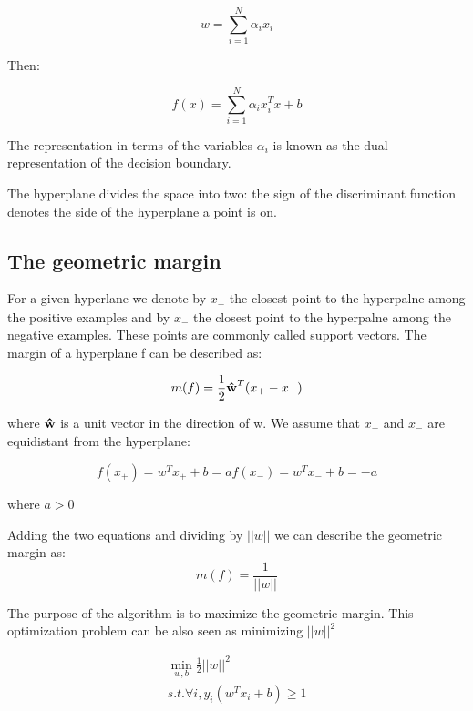 \begin{equation}
w = \sum_{i=1}^{N} \alpha_{i}x_{i}
\end{equation}

Then:

\begin{equation}
f(x) = \sum_{i=1}^{N} \alpha_{i}x_{i}^T x + b
\end{equation}

The representation in terms of the variables $\alpha_{i}$ is known as the dual representation of the decision boundary.

The hyperplane divides the space into two: the sign of the discriminant function  denotes the side of the
hyperplane a point is on.

\subsection{The geometric margin}
For a given hyperlane we denote by $x_{+}$ the closest point to the hyperpalne among the positive examples and by $x_{-}$ the closest point to the hyperpalne among the negative examples. These points are commonly called support vectors.
The margin of a hyperplane f can be described as:

\begin{equation}
m(f) = \frac{1}{2}\boldsymbol{\hat{\textbf{w}}}^{T}(x_{+}-x_{-}) 
\end{equation}

where $\boldsymbol{\hat{\textbf{w}}}$ is a unit vector in the direction of w. We assume that $x_{+}$ and $x_{-}$ are equidistant from
the hyperplane:

\begin{equation}
f(x_{+}) = w^Tx_{+} + b = a
f(x_{-}) = w^Tx_{-} + b = -a
\end{equation}

where $a>0$

Adding the two equations and dividing by $||w||$ we can describe the geometric margin as:
\begin{equation}
m(f) = \frac{1}{||w||}
\end{equation}

The purpose of the algorithm is to maximize the geometric margin. This optimization problem can be also seen as minimizing $||w||^2$

\begin{equation}
\begin{multlined}
\min_{w,b} \frac{1}{2}||w||^2 \\
s.t. \forall i, y_{i}(w^Tx_{i} + b) \geq 1
\end{multlined}
\end{equation}

